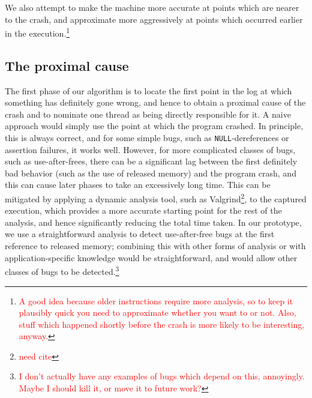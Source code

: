 \documentclass[10pt,twocolumn,preprint,natbib,authoryear]{sigplanconf}
\newcommand{\editorial}[1]{\textcolor{red}{\footnote{\textcolor{red}{#1}}}}
\newcommand{\needCite}{\editorial{need cite}}
\begin{document}
We also attempt to make the machine more accurate at points which are
nearer to the crash, and approximate more aggressively at points which
occurred earlier in the execution.\editorial{A good idea because older
  instructions require more analysis, so to keep it plausibly quick
  you need to approximate whether you want to or not.  Also, stuff
  which happened shortly before the crash is more likely to be
  interesting, anyway.}

\subsection{The proximal cause}
The first phase of our algorithm is to locate the first point in the
log at which something has definitely gone wrong, and hence to obtain
a proximal cause of the crash and to nominate one thread as being
directly responsible for it.  A naive approach would simply use the
point at which the program crashed.  In principle, this is always
correct, and for some simple bugs, such as \verb|NULL|-dereferences or
assertion failures, it works well.  However, for more complicated
classes of bugs, such as use-after-frees, there can be a significant
lag between the first definitely bad behavior (such as the use of
released memory) and the program crash, and this can cause later
phases to take an excessively long time.  This can be mitigated by
applying a dynamic analysis tool, such as Valgrind\needCite{}, to the
captured execution, which provides a more accurate starting point for
the rest of the analysis, and hence significantly reducing the total
time taken.  In our prototype, we use a straightforward analysis to
detect use-after-free bugs at the first reference to released memory;
combining this with other forms of analysis or with
application-specific knowledge would be straightforward, and would
allow other classes of bugs to be detected.\editorial{I don't actually
  have any examples of bugs which depend on this, annoyingly.  Maybe I
  should kill it, or move it to future work?}
\end{document}
